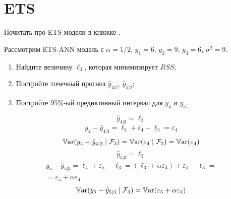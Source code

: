 

\chapter{ETS}

Почитать про ETS модели в книжке \cite{hyndman2018forecasting}.

\begin{problem}
  Рассмотрим ETS-ANN модель с $\alpha = 1/2$, $y_1=6$, $y_2=9$, $y_3 = 6$, $\sigma^2=9$.


  \begin{enumerate}
    \item Найдите величину $\ell_0$, которая минимизирует $RSS$;
    \item Постройте точечный прогноз $\hat y_{4|2}$, $\hat y_{5|2}$;
     \item Постройте 95\%-ый предиктивный интервал для $y_{4}$ и $y_{5}$.
  \end{enumerate}
\begin{sol}
  \[
    \hat y_{4|3} = \ell_3 
  \]
  \[
    y_4 - \hat y_{4|3} = \ell_3 + \varepsilon_4 - \ell_3 = \varepsilon_4  
  \]
  \[
  \operatorname{\mathbb{V}\mathrm{ar}}(y_4 - \hat y_{4|3} \mid \mathcal{F}_3) = \operatorname{\mathbb{V}\mathrm{ar}}(\varepsilon_4 \mid \mathcal{F}_3) = \operatorname{\mathbb{V}\mathrm{ar}}(\varepsilon_4)  
  \]
  \[
  \hat y_{5|3} = \ell_3 
  \]
  \begin{multline}
  y_5 - \hat y_{5|3} = \ell_4  + \varepsilon_5 - \ell_3  = (\ell_3 + \alpha \varepsilon_4)  + 
   \varepsilon_5 - \ell_3 = \\
  = \varepsilon_5 + \alpha  \varepsilon_4 
  \end{multline}
  \[
  \operatorname{\mathbb{V}\mathrm{ar}}(y_5 - \hat y_{5|3} \mid \mathcal{F}_3) = \operatorname{\mathbb{V}\mathrm{ar}}(\varepsilon_5 + \alpha  \varepsilon_4 )  
  \]
    
\end{sol}
\end{problem}

